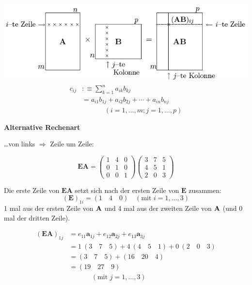     	\begin{falg}
    		\includegraphics[width=\textwidth]{img/matrix_multiplikation.png}
        	\begin{align*}
        		c_{ij} & :\equiv \sum_{k=1}^{n} a_{ik} b_{kj} \\
        		& = a_{i1} b_{1j} + a_{i2} b_{2j} + \cdots + a_{in} b_{nj} \\
        		&\mathrel{\phantom{=}} \qquad (i = 1, \dots ,m; j = 1, \dots ,p) 
        	\end{align*}
        \end{falg}
    
    	
    	\textbf{Alternative Rechenart}
    	
    	\dots von links $\Rightarrow$ Zeile um Zeile:
    	
    	\[
    		\mathbf{EA} =
    		\begin{pmatrix}
				1 & 4 & 0\\
				0 & 1 & 0\\
				0 & 0 & 1
 			\end{pmatrix}
 			\begin{pmatrix}
				3 & 7 & 5 \\
				4 & 5 & 1 \\
				2 & 0 & 3
			\end{pmatrix}
    	\]
    	
    	Die erste Zeile von $\mathbf{EA}$ setzt sich nach der ersten Zeile von 
    	$\mathbf{E}$ zusammen: 
    	\[
    		(\mathbf{E})_{1i} = (1 \quad 4 \quad 0) 
    			\quad (\text{mit } i = 1,\dots ,3)
    	\]
    	1 mal aus der ersten Zeile von $\mathbf{A}$ und 4 mal aus der zweiten
    	Zeile von $\mathbf{A}$ (und 0 mal der dritten Zeile).
		
		\begin{align*}
			(\mathbf{EA})_{1j} & = e_{11} \mathbf{a}_{1j} + e_{12} \mathbf{a}_{2j}
				+ e_{13} \mathbf{a}_{3j} \\
			& = 1 \ (3 \quad 7 \quad 5) + 4 \ (4 \quad 5 \quad 1) 
				+ 0 \ (2 \quad 0 \quad 3) \\
			& = (3 \quad 7 \quad 5) + (16 \quad 20 \quad 4) \\
			& = (19 \quad 27 \quad 9) \\
			&\mathrel{\phantom{=}} \qquad (\text{mit } j = 1,\dots ,3)
		\end{align*}
		
